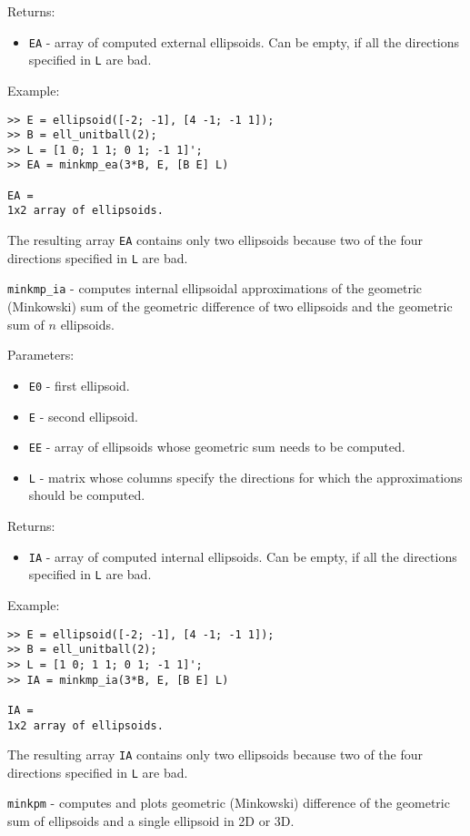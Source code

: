 Returns:
\begin{itemize}
\item {\tt EA} - array of computed external ellipsoids. Can be empty, if
all the directions specified in {\tt L} are bad.
\end{itemize}

Example:
{\tt \begin{verbatim}
>> E = ellipsoid([-2; -1], [4 -1; -1 1]);
>> B = ell_unitball(2);
>> L = [1 0; 1 1; 0 1; -1 1]';
>> EA = minkmp_ea(3*B, E, [B E] L)

EA =
1x2 array of ellipsoids.
\end{verbatim} }
The resulting array {\tt EA} contains only two ellipsoids because two
of the four directions specified in {\tt L} are bad.

\newpage

{\Large {\tt minkmp\_ia}} - computes internal ellipsoidal approximations
of the geometric (Minkowski) sum of the geometric difference of two ellipsoids
and the geometric sum of $n$ ellipsoids.

Parameters:
\begin{itemize}
\item {\tt E0} - first ellipsoid.
\item {\tt E} - second ellipsoid.
\item {\tt EE} - array of ellipsoids whose geometric sum needs to be computed.
\item {\tt L} - matrix whose columns specify the directions for which
the approximations should be computed.
\end{itemize}

Returns:
\begin{itemize}
\item {\tt IA} - array of computed internal ellipsoids. Can be empty, if
all the directions specified in {\tt L} are bad.
\end{itemize}

Example:
{\tt \begin{verbatim}
>> E = ellipsoid([-2; -1], [4 -1; -1 1]);
>> B = ell_unitball(2);
>> L = [1 0; 1 1; 0 1; -1 1]';
>> IA = minkmp_ia(3*B, E, [B E] L)

IA =
1x2 array of ellipsoids.
\end{verbatim} }
The resulting array {\tt IA} contains only two ellipsoids because two
of the four directions specified in {\tt L} are bad.

\newpage

{\Large {\tt minkpm}} - computes and plots geometric (Minkowski) difference of
the geometric sum of ellipsoids and a single ellipsoid in 2D or 3D.

